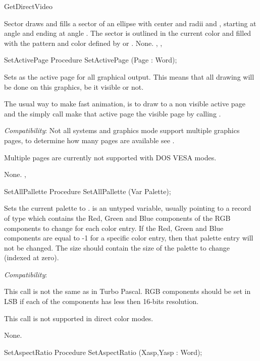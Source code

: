 \begin{function}{GetDirectVideo}
\begin{procedure}{Sector}
\Description
{}
draws and fills a sector of an ellipse  with center  and radii
 and , starting at angle  and ending at angle
. The sector is outlined in the current color and filled with
the pattern and color defined by  or .
\Errors
None.
\SeeAlso
{}, , 
\end{procedure}
\begin{procedure}{SetActivePage}
\Declaration
Procedure SetActivePage (Page : Word);

\Description
Sets  as the active page
for all graphical output. This means that all drawing will be done on this
graphics, be it visible or not.

The usual way to make fast animation, is to draw to a non visible active page
and the simply call make that active page the visible page by calling
.

\textit{Compatibility}:
Not all systems and graphics mode support multiple graphics pages, to
determine how many pages are available see .

Multiple pages are currently not supported with DOS VESA modes.

\Errors
None.
\SeeAlso
{}, 

\end{procedure}
\begin{procedure}{SetAllPallette}
\Declaration
Procedure SetAllPallette (Var Palette);

\Description
Sets the current palette to
.  is an untyped variable, usually pointing to a
record of type  which contains the Red, Green and Blue
components of the RGB components to change for each color entry. If
the Red, Green and Blue components are equal to -1 for a specific color
entry, then that palette entry will not be changed. The size should
contain the size of the palette to change (indexed at zero).

\textit{Compatibility}:

This call is not the same as in Turbo Pascal. RGB components should be
set in LSB if each of the components has less then 16-bits resolution.

This call is not supported in direct color modes.

\Errors
None.
\SeeAlso
{}
\end{procedure}
\begin{procedure}{SetAspectRatio}
\Declaration
Procedure SetAspectRatio (Xasp,Yasp : Word);


\end{procedure}
\end{function}
